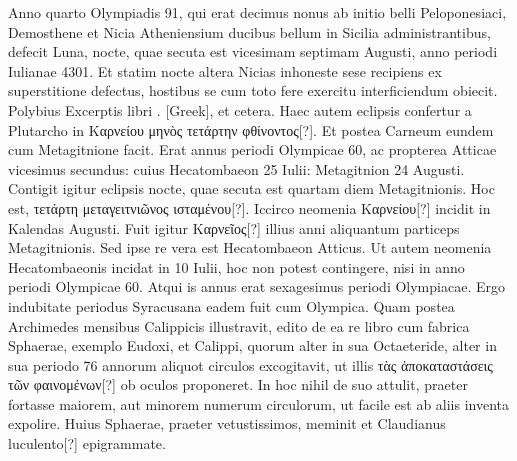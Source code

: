 Anno quarto Olympiadis 91, qui erat decimus nonus ab initio
belli Peloponesiaci, Demosthene et Nicia Atheniensium ducibus
bellum in Sicilia administrantibus, defecit Luna, nocte,
quae secuta est vicesimam septimam Augusti, anno periodi Iulianae
4301.
Et statim nocte altera Nicias inhoneste sese recipiens
ex superstitione defectus, hostibus se cum toto fere exercitu interficiendum
obiecit.
Polybius Excerptis libri .
\textgreek{[Greek]}, et cetera.
Haec autem eclipsis confertur
a Plutarcho in \textgreek{Καρνείου μηνὸς τετάρτην φθίνοντος[?]}.
Et postea
Carneum eundem cum Metagitnione facit.
Erat annus periodi Olympicae
60, ac propterea Atticae vicesimus secundus: cuius Hecatombaeon
25 Iulii: Metagitnion 24 Augusti.
Contigit igitur
eclipsis nocte, quae secuta est quartam diem Metagitnionis.
Hoc
est, \textgreek{τετάρτη μεταγειτνιῶνος ισταμένου[?]}.
Iccirco neomenia \textgreek{Καρνείου[?]} incidit
in Kalendas Augusti.
Fuit igitur \textgreek{Καρνεῖος[?]} illius anni aliquantum
particeps Metagitnionis.
Sed ipse re vera est Hecatombaeon
Atticus.
Ut autem neomenia Hecatombaeonis incidat in 10 Iulii,
hoc non potest contingere, nisi in anno periodi Olympicae 60.
Atqui
is annus erat sexagesimus periodi Olympiacae.
Ergo indubitate
periodus Syracusana eadem fuit cum Olympica.
Quam postea
Archimedes mensibus Calippicis illustravit, edito de ea re libro
cum fabrica Sphaerae, exemplo Eudoxi, et Calippi, quorum alter
in sua Octaeteride, alter in sua periodo 76 annorum aliquot
circulos excogitavit, ut illis
 \textgreek{τὰς ἀποκαταστάσεις τῶν φαινομένων[?]} ob oculos
proponeret.
In hoc nihil de suo attulit, praeter fortasse maiorem,
aut minorem numerum circulorum, ut facile est ab aliis inventa expolire.
Huius Sphaerae, praeter vetustissimos, meminit et Claudianus
luculento[?] epigrammate.

